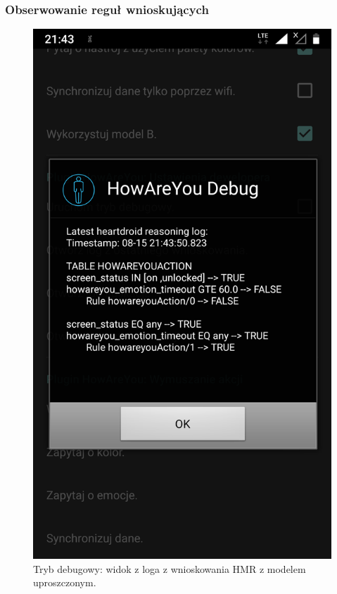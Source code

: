 \subsubsection{Obserwowanie reguł wnioskujących}

\begin{figure}[H]
	\centering
	\includegraphics[scale=0.15]{rozdzial4/HMR_screenshots_B.png}
	\caption{Tryb debugowy: widok z loga z wnioskowania HMR z modelem uproszczonym.}
\end{figure}

